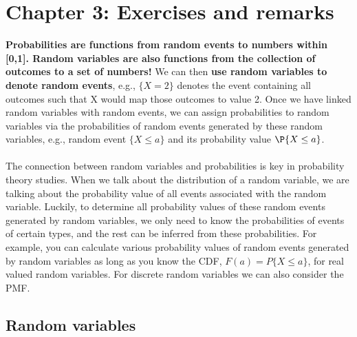 

\chapter{Chapter 3: Exercises and remarks}
\textbf{Probabilities are functions from random events to numbers within [0,1]. Random variables are also functions from the collection of outcomes to a set of numbers!} 
We can then \textbf{use random variables to denote random events},
e.g., $\{X = 2\}$ denotes the event containing all outcomes such that X would map those outcomes to value 2. Once we
have linked random variables with random events, we can assign probabilities to random variables via the probabilities of random events generated by these random variables, e.g., random event $\{X\leq a\}$ and its probability value $\P{X\leq a}$.\\~\\
The connection between random variables and probabilities is key in probability theory studies. When we talk about the distribution of a random variable, we are
talking about the probability value of all events associated with the random variable. Luckily, to determine all probability
values of these random events generated by random variables, we only need to know the probabilities of events of certain types, and the rest
can be inferred from these probabilities. For example, you can calculate various probability values of random events generated by random variables as long as you know the CDF, $F(a)=P\{X\leq a \}$, for real valued random variables. For discrete random variables we can also consider the PMF.

\section{Random variables}
\label{sec:section-3.1}

